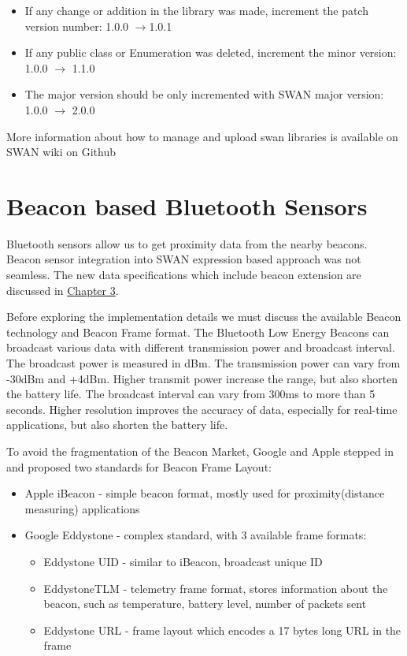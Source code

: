 \begin{itemize}
 \item If any change or addition  in the library was made, increment the patch version number: 1.0.0 $\rightarrow$1.0.1
 \item If any public class or Enumeration was deleted, increment the minor version: 1.0.0 $\rightarrow$ 1.1.0 
 \item The major version should be only incremented with SWAN major version: 1.0.0 $\rightarrow$ 2.0.0
\end{itemize}

More information about how to manage and upload swan libraries is available on SWAN wiki on Github\cite{swanWiki}

\section{Beacon based Bluetooth Sensors}

Bluetooth sensors allow us to get proximity data from the nearby beacons. Beacon sensor integration into SWAN expression based approach was not seamless.
The new data specifications which include beacon extension are discussed in \hyperref[Chapter3]{Chapter 3}.

Before exploring the implementation details we must discuss the available Beacon technology and Beacon Frame format.
The Bluetooth Low Energy Beacons can broadcast various data with different transmission power and broadcast interval.
The broadcast power is measured in dBm\cite{dbiRef}. The transmission power can vary from -30dBm and +4dBm. Higher transmit power
increase the range, but also shorten the battery life. The broadcast interval can vary from 300ms to more than 5 seconds. Higher resolution improves the accuracy of data,
especially for real-time applications, but also shorten the battery life.

To avoid the fragmentation of the Beacon Market, Google and Apple stepped in and proposed two standards for Beacon Frame Layout:
\begin{itemize}
 \item Apple iBeacon - simple beacon format, mostly used for proximity(distance measuring) applications
 \item Google Eddystone - complex standard, with 3 available frame formats:
 \begin{itemize}
  \item Eddystone UID - similar to iBeacon, broadcast unique ID
  \item EddystoneTLM - telemetry frame format, stores information about the beacon, such as temperature, battery level, number of packets sent
  \item Eddystone URL - frame layout which encodes a 17 bytes long URL in the frame
 \end{itemize}
\end{itemize}

